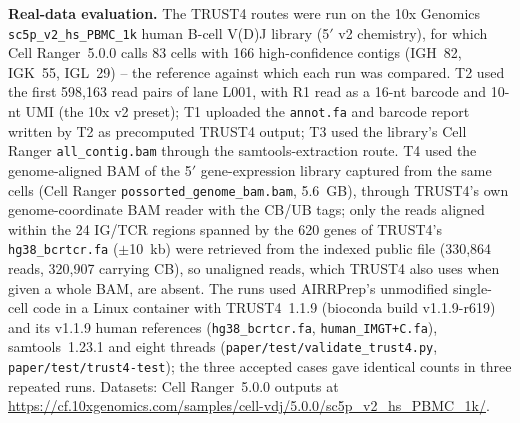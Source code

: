 \documentclass[11pt]{article}
\begin{document}
\textbf{Real-data evaluation.} The TRUST4 routes were run on the 10x Genomics
\texttt{sc5p\_v2\_hs\_PBMC\_1k} human B-cell V(D)J library (5$'$ v2 chemistry),
for which Cell Ranger~5.0.0 calls 83 cells with 166 high-confidence contigs
(IGH~82, IGK~55, IGL~29) -- the reference against which each run was compared.
T2 used the first 598,163 read pairs of lane L001, with R1 read as a 16-nt
barcode and 10-nt UMI (the 10x v2 preset); T1 uploaded the \texttt{annot.fa}
and barcode report written by T2 as precomputed TRUST4 output; T3 used the
library's Cell Ranger \texttt{all\_contig.bam} through the samtools-extraction
route. T4 used the genome-aligned BAM of the 5$'$ gene-expression library
captured from the same cells (Cell Ranger \texttt{possorted\_genome\_bam.bam},
5.6~GB), through TRUST4's own genome-coordinate BAM reader with the CB/UB tags;
only the reads aligned within the 24 IG/TCR regions spanned by the 620 genes of
TRUST4's \texttt{hg38\_bcrtcr.fa} ($\pm$10~kb) were retrieved from the indexed
public file (330,864 reads, 320,907 carrying CB), so unaligned reads, which
TRUST4 also uses when given a whole BAM, are absent. The runs used AIRRPrep's unmodified single-cell code in a Linux
container with TRUST4~1.1.9 (bioconda build v1.1.9-r619) and its v1.1.9 human
references (\texttt{hg38\_bcrtcr.fa}, \texttt{human\_IMGT+C.fa}), samtools~1.23.1
and eight threads (\texttt{paper/test/validate\_trust4.py},
\texttt{paper/test/trust4-test}); the three accepted cases gave identical counts
in three repeated runs. Datasets: Cell Ranger~5.0.0 outputs at
\url{https://cf.10xgenomics.com/samples/cell-vdj/5.0.0/sc5p_v2_hs_PBMC_1k/}.
\end{document}
